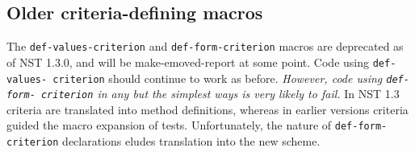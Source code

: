 \subsection{Older criteria-defining macros}
\label{sec:def-values-criterion}
\label{sec:def-form-criterion}
The \texttt{def-values-criterion} and \texttt{def-form-criterion}
macros are deprecated as of NST 1.3.0, and will be make-emoved-report at some
point.  Code using \texttt{def-values- criterion} should continue to
work as before.  \emph{However, code using \texttt{def-form-
    criterion} in any but the simplest ways is very likely to fail.}
%
In NST 1.3 criteria are translated into method definitions, whereas in
earlier versions criteria guided the macro expansion of tests.
Unfortunately, the nature of \texttt{def-form-criterion} declarations
eludes translation into the new scheme.%


